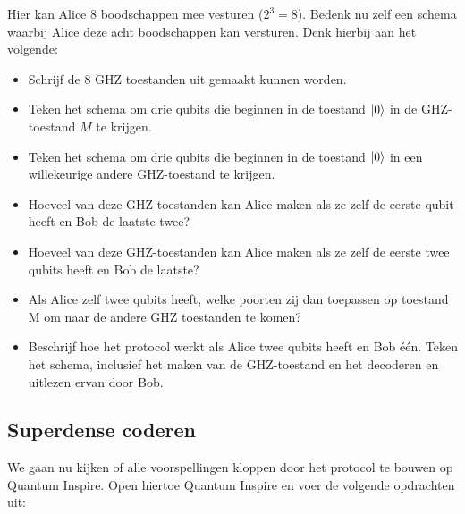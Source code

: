 \documentclass[10pt, a4paper]{article}
\begin{document}
Hier kan Alice 8 boodschappen mee vesturen ($2^3=8$). Bedenk nu zelf een schema waarbij Alice deze acht boodschappen kan versturen. Denk hierbij aan het volgende:
\begin{itemize}
\item Schrijf de 8 GHZ toestanden uit gemaakt kunnen worden.
\item Teken het schema om drie qubits die beginnen in de toestand $\ket{0}$ in de GHZ-toestand $M$ te krijgen.
\item Teken het schema om drie qubits die beginnen in de toestand $\ket{0}$ in een willekeurige andere GHZ-toestand te krijgen.
\item Hoeveel van deze GHZ-toestanden kan Alice maken als ze zelf de eerste qubit heeft en Bob de laatste twee? 
\item Hoeveel van deze GHZ-toestanden kan Alice maken als ze zelf de eerste twee qubits heeft en Bob de laatste?
\item Als Alice zelf twee qubits heeft, welke poorten zij dan toepassen op toestand M om naar de andere GHZ toestanden te komen?
\item Beschrijf hoe het protocol werkt als Alice twee qubits heeft en Bob \'{e}\'{e}n. Teken het schema, inclusief het maken van de GHZ-toestand en het decoderen en uitlezen ervan door Bob.
\end{itemize}

\subsection*{Superdense coderen}
We gaan nu kijken of alle voorspellingen kloppen door het protocol te bouwen op Quantum Inspire. Open hiertoe Quantum Inspire en voer de volgende opdrachten uit:
\end{document}
